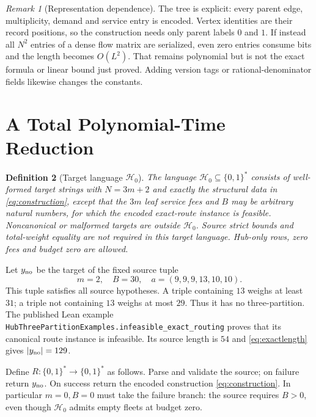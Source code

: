 \documentclass[11pt]{article}
\newtheorem{definition}{Definition}[section]
\theoremstyle{remark}
\newtheorem{remark}[definition]{Remark}
\newcommand{\code}[1]{\nolinkurl{#1}}
\newcommand{\bits}{\{0,1\}^{*}}
\newcommand{\Hstar}{\mathcal H_0}
\begin{document}
\begin{remark}[Representation dependence]
The tree is explicit: every parent edge, multiplicity, demand and service
entry is encoded. Vertex identities are their record positions, so the
construction needs only parent labels $0$ and $1$. If instead all $N^2$
entries of a dense flow matrix are serialized, even zero entries consume
bits and the length becomes $O(L^2)$. That remains polynomial but is not
the exact formula or linear bound just proved. Adding version tags or
rational-denominator fields likewise changes the constants.
\end{remark}

\section{A Total Polynomial-Time Reduction}
\label{sec:reduction}

\begin{definition}[Target language $\Hstar$]\label{def:h0}
The language $\Hstar\subseteq\bits$ consists of well-formed target strings
with $N=3m+2$ and exactly the structural data in
\eqref{eq:construction}, except that the $3m$ leaf service fees and $B$
may be arbitrary natural numbers, for which the encoded exact-route
instance is feasible. Noncanonical or malformed targets are outside
$\Hstar$. Source strict bounds and total-weight equality are not required
in this target language. Hub-only rows, zero fees and budget zero are allowed.
\end{definition}

Let $y_{\rm no}$ be the target of the fixed source tuple
\[
 m=2,\quad B=30,\quad a=(9,9,9,13,10,10).
\]
This tuple satisfies all source hypotheses. A triple containing $13$ weighs
at least $31$; a triple not containing $13$ weighs at most $29$.
Thus it has no three-partition. The published Lean example
\code{HubThreePartitionExamples.infeasible_exact_routing} proves that its
canonical route instance is infeasible. Its source length is $54$ and
\eqref{eq:exactlength} gives $|y_{\rm no}|=129$.

Define $R:\bits\to\bits$ as follows. Parse and validate the source; on
failure return $y_{\rm no}$. On success return the encoded construction
\eqref{eq:construction}. In particular $m=0,B=0$ must take the failure
branch: the source requires $B>0$, even though $\Hstar$ admits empty fleets
at budget zero.
\end{document}
